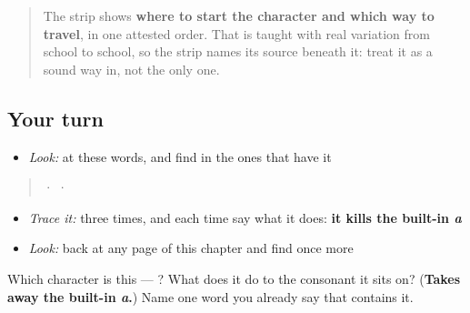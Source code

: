 \begin{quote}
The strip shows \textbf{where to start the character and which way to travel}, in one attested order. That is taught with real variation from school to school, so the strip names its source beneath it: treat it as a sound way in, not the only one.
\end{quote}

\subsection*{Your turn}
\begin{itemize}
\raggedright
  \item \emph{Look:} at these words, and find  in the ones that have it
\end{itemize}

\begin{quote}
  ·    ·  
\end{quote}

\begin{itemize}
\raggedright
  \item \emph{Trace it:}  three times, and each time say what it does: \textbf{it kills the built-in \emph{a}}
  \item \emph{Look:} back at any page of this chapter and find  once more
\end{itemize}

\begin{tcolorbox}[breakable,colback=teal!4,colframe=teal!35!black,title={Before you move on}]
Which character is this — ? What does it do to the consonant it sits on? (\textbf{Takes away the built-in \emph{a}.}) Name one word you already say that contains it.
\end{tcolorbox}
